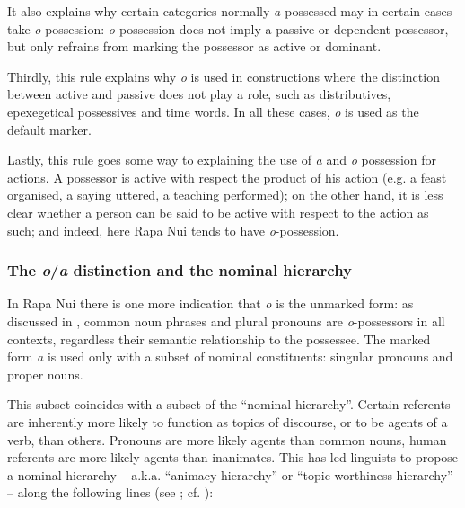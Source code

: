 It also explains why certain categories normally \textit{a-}possessed may in certain cases take \textit{o}{}-possession: \textit{o-}possession does not imply a passive or dependent possessor, but only refrains from marking the possessor as active or dominant. 

Thirdly, this rule explains why \textit{o} is used in constructions where the distinction between active and passive does not play a role, such as distributives, epexegetical possessives and time words. In all these cases, \textit{o} is used as the default marker.

Lastly, this rule goes some way to explaining the use of \textit{a} and \textit{o} possession for actions. A possessor is active with respect the product of his action (e.g. a feast organised, a saying uttered, a teaching performed); on the other hand, it is less clear whether a person can be said to be active with respect to the action as such; and indeed, here Rapa Nui tends to have \textit{o}{}-possession.

\subsubsection[The o/a distinction and the nominal hierarchy]{The \textit{o}/\textit{a} distinction and the nominal hierarchy}\label{sec:6.3.4.4}
In Rapa Nui there is one more indication that \textit{o} is the unmarked form: as discussed in , common noun phrases and plural pronouns are \textit{o}{}-possessors in all contexts, regardless their semantic relationship to the possessee. The marked form \textit{{\ꞌ}a} is used only with a subset of nominal constituents: singular pronouns and proper nouns. 

This subset coincides with a subset of the “nominal hierarchy”. Certain referents are inherently more likely to function as topics of discourse, or to be agents of a verb, than others. Pronouns are more likely agents than common nouns, human referents are more likely agents than inanimates. This has led linguists to propose a nominal hierarchy – a.k.a. “animacy hierarchy” or “topic-worthiness hierarchy” – along the following lines (see \citealt[150]{Payne1997}; cf. \citealt[413]{Foley2007}):

